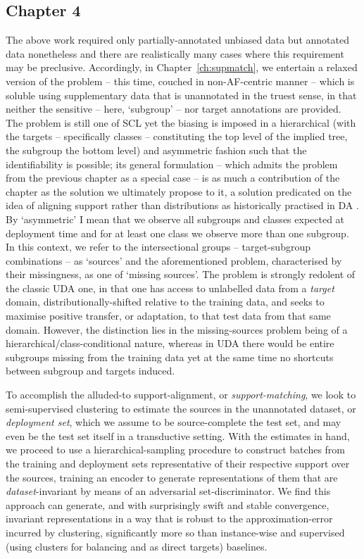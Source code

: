 \subsection*{Chapter 4}%
%
The above work required only partially-annotated unbiased data but annotated data nonetheless and
there are realistically many cases where this requirement may be preclusive.
%
Accordingly, in Chapter~\ref{ch:supmatch}, we entertain a relaxed version of the problem -- this
time, couched in non-\ac{AF}-centric manner -- which is soluble using supplementary data that is
unannotated in the truest sense, in that neither the sensitive -- here, `subgroup' -- nor target
annotations are provided.
%
The problem is still one of \ac{SCL} yet the biasing is imposed in a hierarchical (with the targets
-- specifically classes -- constituting the top level of the implied tree, the subgroup the bottom
level) and asymmetric fashion such that the identifiability is possible; its general formulation --
which admits the problem from the previous chapter as a special case -- is as much a contribution
of the chapter as the solution we ultimately propose to it, a solution predicated on the idea of
aligning support rather than distributions as historically practised in \acs{DA}
\citep{ben2006analysis}.
%
By `asymmetric' I mean that we observe all subgroups and classes expected at deployment time and
for at least one class we observe more than one subgroup. 
%
In this context, we refer to the intersectional groups -- target-subgroup combinations -- as
`sources' and the aforementioned problem, characterised by their missingness, as one of `missing
sources'.
%
The problem is strongly redolent of the classic \ac{UDA} one, in that one has access to unlabelled
data from a \emph{target} domain, distributionally-shifted relative to the training data, and seeks
to maximise positive transfer, or adaptation, to that test data from that same domain.
%
However, the distinction lies in the missing-sources problem being of a
hierarchical/class-conditional nature, whereas in \ac{UDA} there would be entire subgroups missing
from the training data yet at the same time no shortcuts between subgroup and targets induced.

%
To accomplish the alluded-to support-alignment, or \emph{support-matching}, we look to
semi-supervised clustering to estimate the sources in the unannotated dataset, or \emph{deployment
set}, which we assume to be source-complete \wrt{} the test set, and may even be the test set
itself in a transductive setting.
%
With the estimates in hand, we proceed to use a hierarchical-sampling procedure to construct
batches from the training and deployment sets representative of their respective support over the
sources, training an encoder to generate representations of them that are \emph{dataset}-invariant
by means of an adversarial set-discriminator.
%
We find this approach can generate, and with surprisingly swift and stable convergence, invariant
representations in a way that is robust to the approximation-error incurred by clustering,
significantly more so than instance-wise and supervised (using clusters for balancing and as direct
targets) baselines.
%
